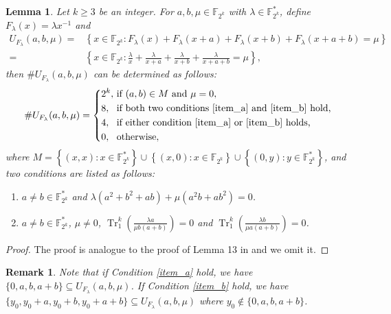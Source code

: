 \documentclass{article}
\newcommand{\F}{\mathbb{F}}
\newcommand{\0}{\textbf{0}}
\newcommand{\1}{\textbf{1}}
\newcommand{\TRACE}{\operatorname{Tr}_1^k}
\theoremstyle{plain}
\newtheorem{lemma}{Lemma}
\newtheorem{remark}{Remark}
\begin{document}
    \begin{lemma}\label{lemma:num_sol_second_dev}
        Let $k\ge 3$ be an integer.
        For $a,b,\mu\in\F_{2^k}$ with $\lambda\in\F_{2^k}^*$, define $F_{\lambda}(x)=\lambda x^{-1}$ and
        \begin{align*}
            U_{F_{\lambda}}(a,b,\mu)=&\left\{x\in\F_{2^k} : F_{\lambda}(x)+F_{\lambda}(x+a)+F_{\lambda}(x+b)+F_{\lambda}(x+a+b)=\mu\right\}\\
            =&\left\{ x\in\F_{2^k} : \frac{\lambda}{x}+\frac{\lambda}{x+a}+\frac{\lambda}{x+b}+\frac{\lambda}{x+a+b}=\mu \right\},
        \end{align*}
        then $\# U_{F_{\lambda}}(a,b,\mu)$ can be determined as follows:
        \[\# U_{F_{\lambda}}(a,b,\mu) = \left\{
            \begin{alignedat}{2}
                &2^k,&&\text{ if }(a,b)\in M\text{ and }\mu = 0,\\
                &8,&&\text{ if both two conditions }\ref{item_a}\text{ and }\ref{item_b}\text{ hold,}\\
                &4,&&\text{ if either condition }\ref{item_a}\text{ or }\ref{item_b}\text{ holds,}\\
                &0,&&\text{ otherwise},
            \end{alignedat}\right.\]
        where $M=\left\{ (x,x):x\in\F_{2^k}^* \right\}\cup\left\{ (x,0):x\in\F_{2^k} \right\}\cup\left\{ (0,y):y\in\F_{2^k}^* \right\}$, and two conditions are listed as follows:
        \begin{enumerate}[label=(\arabic{*})]
            \item $a\ne b\in\F_{2^k}^*$ and $\lambda(a^2+b^2+ab)+\mu(a^2b+ab^2)=0$.\label{item_a}
            \item $a\ne b\in\F_{2^k}^*$, $\mu\ne 0$, $\TRACE\left(\frac{\lambda a}{\mu b(a+b)}\right)=0$ and
            $\TRACE\left(\frac{\lambda b}{\mu a(a+b)}\right)=0$.\label{item_b}
        \end{enumerate}
    \end{lemma}
    \begin{proof}
        The proof is analogue to the proof of Lemma 13 in \cite{TangMM2022inversefunction} and we omit it.
    \end{proof}
    \begin{remark}
        Note that if Condition \ref{item_a} hold, we have $\{0,a,b,a+b\}\subseteq U_{F_{\lambda} }(a,b,\mu)$. 
        If Condition \ref{item_b} hold, we have $\{y_0,y_0+a,y_0+b,y_0+a+b\}\subseteq U_{F_{\lambda}}(a,b,\mu)$ where $y_0\notin\{0,a,b,a+b\}$.
    \end{remark}
\end{document}
